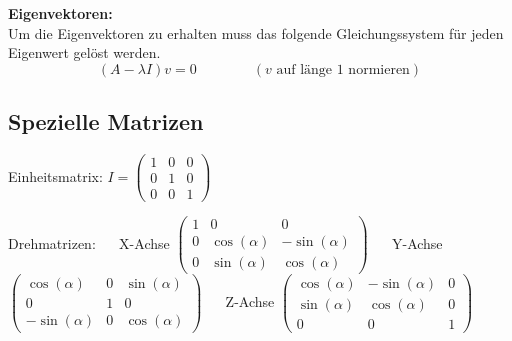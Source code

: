 \textbf{Eigenvektoren:}\\
Um die Eigenvektoren zu erhalten muss das folgende Gleichungssystem für jeden
Eigenwert gelöst werden.
\[ 
	(A-\lambda I)v=0 \qquad \qquad (v \text{ auf länge 1 normieren})
\]

\subsection{Spezielle Matrizen}
Einheitsmatrix: 
$I= \begin{pmatrix} 
1 & 0 & 0 \\
0 & 1 & 0 \\
0 & 0 & 1
\end{pmatrix}$

\vspace{0.5cm}

Drehmatrizen:
$\quad$
X-Achse
$\begin{pmatrix} 
	1 & 0 & 0 \\
	0 & \cos(\alpha) & -\sin(\alpha) \\
	0 & \sin(\alpha) & \cos(\alpha)
\end{pmatrix}$
$\quad$
Y-Achse
$\begin{pmatrix} 
	\cos(\alpha) & 0 & \sin(\alpha) \\
	0 & 1 & 0 \\
	-\sin(\alpha) & 0 & \cos(\alpha)
\end{pmatrix}$
$\quad$
Z-Achse
$\begin{pmatrix} 
	\cos(\alpha) & -\sin(\alpha) & 0 \\
	\sin(\alpha) & \cos(\alpha) & 0 \\
	0 & 0 & 1
\end{pmatrix}$

